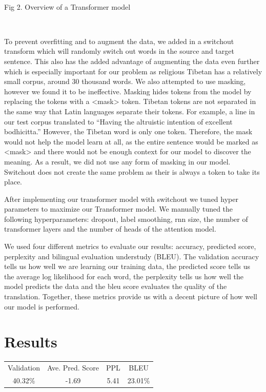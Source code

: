 \documentclass[letterpaper, 12 pt, conference]{ieeeconf}  %
\begin{document}
\caption{\\Fig 2. Overview of a Transformer model \cite{c11}}
\\
\par
To prevent overfitting and to augment the data, we added in a switchout transform which will randomly switch out words in the source and target sentence. This also has the added advantage of augmenting the data even further which is especially important for our problem as religious Tibetan has a relatively small corpus, around 30 thousand words. We also attempted to use masking, however we found it to be ineffective. Masking hides tokens from the model by replacing the tokens with a <mask> token. Tibetan tokens are not separated in the same way that Latin languages separate their tokens. For example,
a line in our test corpus translated to “Having the altruistic intention of excellent bodhicitta.” However, the Tibetan word is only one token. Therefore, the mask would not help the model learn at all, as the entire sentence would be marked as <mask> and there would not be enough context for our model to discover the meaning. As a result, we did not use any form of masking in our model. Switchout does not create the same problem as their is always a token to take its place. \par
After implementing our transformer model with switchout we tuned hyper parameters to maximize our Transformer model. We manually tuned the following hyperparameters: dropout, label smoothing, rnn size, the number of transformer layers and the number of heads of the attention model.  \par
We used four different metrics to evaluate our results: accuracy, predicted score, perplexity and bilingual evaluation understudy (BLEU). The validation accuracy tells us how well we are learning our training data, the predicted score tells us the average log likelihood for each word, the perplexity tells us how well the model predicts the data and the bleu score evaluates the quality of the translation. Together, these metrics provide us with a decent picture of how well our model is performed. 

\section{Results}
\begin{tabular}{ |c| c| c| c| }
 Validation & Ave. Pred. Score & PPL & BLEU \\ 
 40.32\% & -1.69 & 5.41 & 23.01\% \\

\end{tabular}\\
\end{document}
